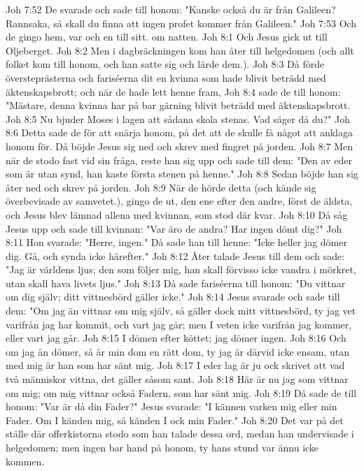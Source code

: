 Joh 7:52  De svarade och sade till honom: "Kanske också du är från Galileen? Rannsaka, så skall du finna att ingen profet kommer från Galileen."
Joh 7:53  Och de gingo hem, var och en till sitt. om natten.
Joh 8:1  Och Jesus gick ut till Oljeberget.
Joh 8:2  Men i dagbräckningen kom han åter till helgedomen (och allt folket kom till honom, och han satte sig och lärde dem.).
Joh 8:3  Då förde översteprästerna och fariséerna dit en kvinna som hade blivit beträdd med äktenskapsbrott; och när de hade lett henne fram,
Joh 8:4  sade de till honom: "Mästare, denna kvinna har på bar gärning blivit beträdd med äktenskapsbrott.
Joh 8:5  Nu bjuder Moses i lagen att sådana skola stenas. Vad säger då du?"
Joh 8:6  Detta sade de för att snärja honom, på det att de skulle få något att anklaga honom för. Då böjde Jesus sig ned och skrev med fingret på jorden.
Joh 8:7  Men när de stodo fast vid sin fråga, reste han sig upp och sade till dem: "Den av eder som är utan synd, han kaste första stenen på henne."
Joh 8:8  Sedan böjde han sig åter ned och skrev på jorden.
Joh 8:9  När de hörde detta (och kände sig överbevisade av samvetet.), gingo de ut, den ene efter den andre, först de äldsta, och Jesus blev lämnad allena med kvinnan, som stod där kvar.
Joh 8:10  Då såg Jesus upp och sade till kvinnan: "Var äro de andra? Har ingen dömt dig?"
Joh 8:11  Hon svarade: "Herre, ingen." Då sade han till henne: "Icke heller jag dömer dig. Gå, och synda icke härefter."
Joh 8:12  Åter talade Jesus till dem och sade: "Jag är världens ljus; den som följer mig, han skall förvisso icke vandra i mörkret, utan skall hava livets ljus."
Joh 8:13  Då sade fariséerna till honom: "Du vittnar om dig själv; ditt vittnesbörd gäller icke."
Joh 8:14  Jesus svarade och sade till dem: "Om jag än vittnar om mig själv, så gäller dock mitt vittnesbörd, ty jag vet varifrån jag har kommit, och vart jag går; men I veten icke varifrån jag kommer, eller vart jag går.
Joh 8:15  I dömen efter köttet; jag dömer ingen.
Joh 8:16  Och om jag än dömer, så är min dom en rätt dom, ty jag är därvid icke ensam, utan med mig är han som har sänt mig.
Joh 8:17  I eder lag är ju ock skrivet att vad två människor vittna, det gäller såsom sant.
Joh 8:18  Här är nu jag som vittnar om mig; om mig vittnar också Fadern, som har sänt mig.
Joh 8:19  Då sade de till honom: "Var är då din Fader?" Jesus svarade: "I kännen varken mig eller min Fader. Om I känden mig, så känden I ock min Fader."
Joh 8:20  Det var på det ställe där offerkistorna stodo som han talade dessa ord, medan han undervisade i helgedomen; men ingen bar hand på honom, ty hans stund var ännu icke kommen.
